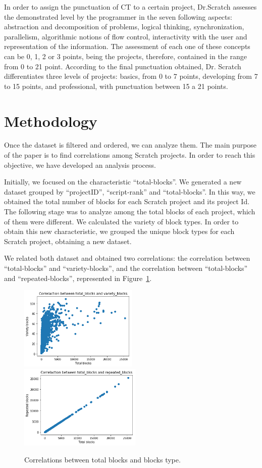 \documentclass[a4paper,twocolumn,10pt]{article}
\begin{document}
In order to assign the punctuation of CT to a certain project, Dr.Scratch assesses the demonstrated
level by the programmer in the seven following aspects: abstraction and decomposition of problems, logical
thinking, synchronization, parallelism, algorithmic notions of flow control, 
interactivity with the user and representation of the information. The 
assessment of each one of these concepts can be 0, 1, 2 or 3 points, being
the projects, therefore, contained in the range from 0 to 21 point. According
to the final punctuation obtained, Dr. Scratch differentiates three levels of
projects: basics, from 0 to 7 points, developing from 7 to 15 points, and
professional, with punctuation between 15 a 21 points.

\section{Methodology}
\label{sec:methodology}

Once the dataset is filtered and ordered, we can analyze them.
The main purpose of the paper is to find correlations among Scratch
projects. In order to reach this objective, we have developed an analysis
process.

Initially, we focused on the characteristic ``total-blocks''. We generated a new
dataset grouped by ``projectID'', ``script-rank'' and ``total-blocks''. In this way,
we obtained the total number of blocks for each Scratch project and its project
Id. The following stage was to analyze among the total blocks of each project, 
which of them were different. We calculated the variety of block types. 
In order to obtain this new characteristic, we grouped the unique block types for
each Scratch project, obtaining a new dataset.

We related both dataset and obtained two correlations: the correlation between
``total-blocks'' and ``variety-blocks'', and the correlation between ``total-blocks''
and ``repeated-blocks'', represented in Figure~\ref{tab:corr_1}.


\begin{figure}
\includegraphics[height=4cm]{images/1.png}
\includegraphics[height=4cm]{images/2.png}
\caption{Correlations between total blocks and blocks type.}
\label{tab:corr_1}
\end{figure}
\end{document}
